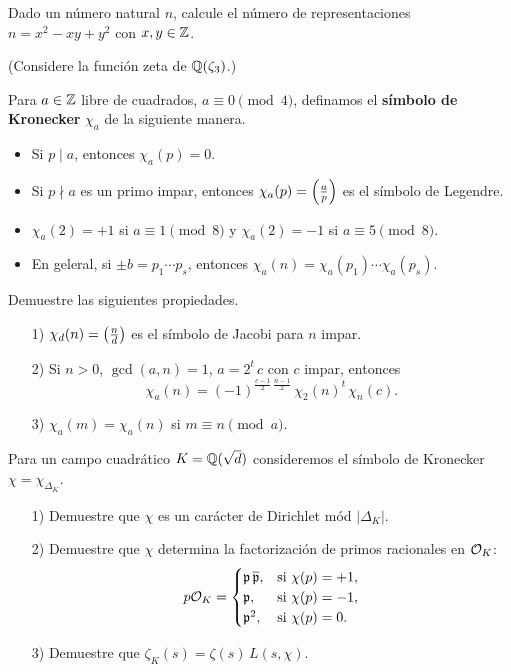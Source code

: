 \begin{ejercicio}
  Dado un número natural $n$, calcule el número de representaciones
  $n = x^2 - xy + y^2$ con $x,y \in \mathbb{Z}$.

  \noindent (Considere la función zeta de $\mathbb{Q} (\zeta_3)$.)
\end{ejercicio}

\begin{ejercicio}
  Para $a \in \mathbb{Z}$ libre de cuadrados, $a \equiv 0 \pmod{4}$, definamos el
  \textbf{símbolo de Kronecker} $\chi_a$ de la siguiente manera.
  \begin{itemize}
  \item Si $p \mid a$, entonces $\chi_a (p) = 0$.
  \item Si $p \nmid a$ es un primo impar, entonces $\chi_a (p) = \left(\frac{a}{p}\right)$
    es el símbolo de Legendre.
  \item $\chi_a (2) = +1$ si $a \equiv 1 \pmod{8}$ y $\chi_a (2) = -1$ si
    $a \equiv 5 \pmod{8}$.
  \item En geleral, si $\pm b = p_1 \cdots p_s$, entonces
    $\chi_a (n) = \chi_a (p_1) \cdots \chi_a (p_s)$.
  \end{itemize}

  Demuestre las siguientes propiedades.
  \begin{enumerate}
  \item[1)] $\chi_d (n) = \left(\frac{n}{d}\right)$ es el símbolo de Jacobi para $n$
    impar.
  \item[2)] Si $n > 0$, $\gcd (a,n) = 1$, $a = 2^t\,c$ con $c$ impar, entonces
    $$\chi_a (n) = (-1)^{\frac{c-1}{2}\,\frac{n-1}{2}}\,\chi_2 (n)^t \, \chi_n (c).$$
  \item[3)] $\chi_a (m) = \chi_a (n)$ si $m \equiv n \pmod{a}$.
  \end{enumerate}
\end{ejercicio}

\begin{ejercicio}
  \label{ejerc:caracter-para-campo-cuadratico}
  Para un campo cuadrático $K = \mathbb{Q} (\sqrt{d})$ consideremos el símbolo de
  Kronecker $\chi = \chi_{\Delta_K}$.

  \begin{enumerate}
  \item[1)] Demuestre que $\chi$ es un carácter de Dirichlet mód $|\Delta_K|$.

  \item[2)] Demuestre que $\chi$ determina la factorización de primos
    racionales en $\mathcal{O}_K$:
    \[ p\mathcal{O}_K = \begin{cases}
      \mathfrak{p}\,\overline{\mathfrak{p}}, & \text{si } \chi (p) = +1,\\
      \mathfrak{p}, & \text{si } \chi (p) = -1,\\
      \mathfrak{p}^2, & \text{si } \chi (p) = 0.
    \end{cases} \]

  \item[3)] Demuestre que $\zeta_K (s) = \zeta (s) \, L (s,\chi)$.
  \end{enumerate}
\end{ejercicio}

